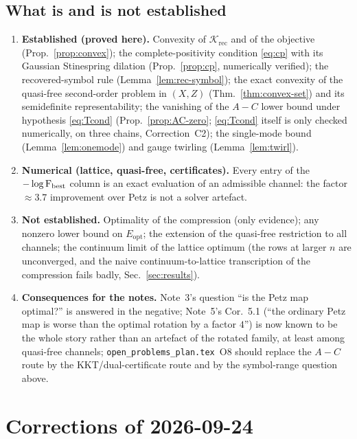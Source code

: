 \documentclass[11pt]{article}
\newcommand{\Erec}{E_{\mathrm{opt}}}
\newcommand{\Krec}{\mathcal K_{\mathrm{rec}}}
\begin{document}
\subsection{What is and is not established}

\begin{enumerate}[leftmargin=1.6em,itemsep=2pt]
\item \textbf{Established (proved here).} Convexity of \(\Krec\) and of the
 objective (Prop.~\ref{prop:convex}); the complete-positivity condition
 \eqref{eq:cp} with its Gaussian Stinespring dilation (Prop.~\ref{prop:cp},
 numerically verified); the recovered-symbol rule (Lemma~\ref{lem:rec-symbol});
 the exact convexity of the quasi-free second-order problem in \((X,Z)\)
 (Thm.~\ref{thm:convex-set}) and its semidefinite representability; the
 vanishing of the \(A\!-\!C\) lower bound under hypothesis \eqref{eq:Tcond} (Prop.~\ref{prop:AC-zero}; \eqref{eq:Tcond} itself is only checked numerically, on three chains, Correction~C2);
 the single-mode bound (Lemma~\ref{lem:onemode}) and gauge twirling
 (Lemma~\ref{lem:twirl}).
\item \textbf{Numerical (lattice, quasi-free, certificates).} Every entry of the
 \(-\log\operatorname{F}_{\text{best}}\) column is an exact evaluation of an admissible
 channel: the factor \(\approx3.7\) improvement over Petz is not a
 solver artefact.
\item \textbf{Not established.} Optimality of the compression (only evidence);
 any nonzero lower bound on \(\Erec\); the extension of the quasi-free
 restriction to all channels; the continuum limit of the lattice optimum (the
 rows at larger \(n\) are unconverged, and the naive continuum-to-lattice
 transcription of the compression fails badly, Sec.~\ref{sec:results}).
\item \textbf{Consequences for the notes.} Note~3's question ``is the Petz map
 optimal?'' is answered in the negative; Note~5's Cor.~5.1 (``the ordinary Petz
 map is worse than the optimal rotation by a factor \(4\)'') is now known to be
 the whole story rather than an artefact of the rotated family, at least among
 quasi-free channels; \texttt{open\_problems\_plan.tex}~O8 should replace the
 \(A\!-\!C\) route by the KKT/dual-certificate route and by the symbol-range
 question above.
\end{enumerate}

\section{Corrections of 2026-09-24}\label{corr0924:sec}
\end{document}

